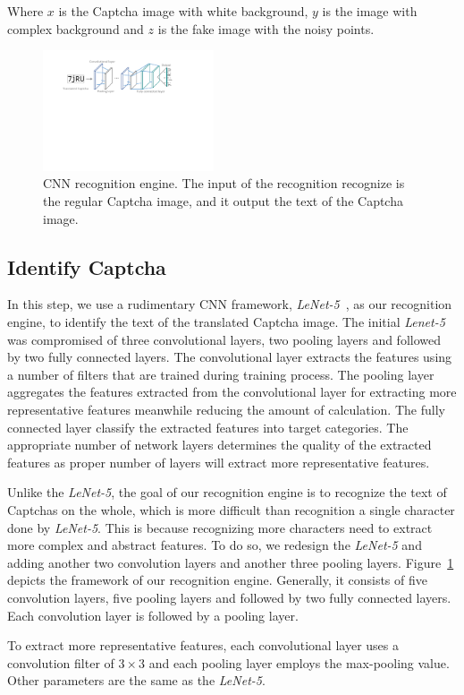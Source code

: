 Where $x$ is the Captcha image with white background, $y$ is the image with complex background and $z$ is the fake image with the noisy points.

\begin{figure}[!t]
  \centering
  \includegraphics[width=0.45\textwidth]{fig/cnn_model.pdf}
  \caption{CNN recognition engine. The input of the recognition recognize is the regular Captcha image, and it output the text of the Captcha image.}
  \label{fig: cnn_model}
\end{figure}

\subsection{Identify Captcha}
In this step, we use a rudimentary CNN framework, \emph{LeNet-5}~\cite{Lecun1998Gradient}, as our recognition engine, to identify the text of the translated Captcha image.
The initial \emph{Lenet-5} was compromised of three convolutional layers, two pooling layers and followed by two fully connected layers.
The convolutional layer extracts the features using a number of filters that are trained during training process. The pooling layer aggregates the features extracted from the convolutional layer for extracting more representative features meanwhile reducing the amount of calculation. The fully connected layer classify the extracted features into target categories. The appropriate number of network layers determines the quality of the extracted features as proper number of layers will extract more representative features.

Unlike the \emph{LeNet-5}, the goal of our recognition engine is to recognize the text of Captchas on the whole, which is more difficult than recognition a single character done by \emph{LeNet-5}. This is because recognizing more characters need to extract more complex and abstract features.
To do so, we redesign the \emph{LeNet-5} and adding another two convolution layers and another three pooling layers.
Figure~\ref{fig: cnn_model} depicts the framework of our recognition engine. Generally, it consists of five convolution layers, five pooling layers and followed by two fully connected layers. Each convolution layer is followed by a pooling layer.

To extract more representative features, each convolutional layer uses a convolution filter of $3 \times 3$ and each pooling layer employs the max-pooling value. Other parameters are the same as the \emph{LeNet-5}.











